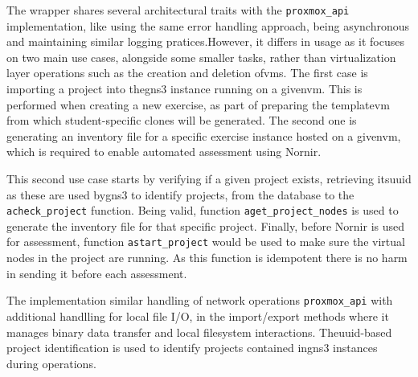         The wrapper shares several architectural traits with the \texttt{proxmox\_api} implementation, like using the same error handling approach,
        being asynchronous and maintaining similar logging pratices.However, it differs in usage as it focuses on two main use cases, 
        alongside some smaller tasks, rather than virtualization layer operations such as the creation and deletion of\ac{vm}s. The first 
        case is importing a project into the\ac{gns3} instance running on a given\ac{vm}. This is performed when creating 
        a new exercise, as part of preparing the template\ac{vm} from which student-specific clones will be generated. The second one 
        is generating an inventory file for a specific exercise instance hosted on a given\ac{vm}, which is required to enable automated 
        assessment using Nornir.

        This second use case starts by verifying if a given project exists, retrieving its\ac{uuid} as these are used by\ac{gns3} to identify 
        projects, from the database to the \texttt{acheck\_project} function. Being valid, function \texttt{aget\_project\_nodes} is used 
        to generate the inventory file for that specific project. Finally, before Nornir is used for assessment, function \texttt{astart\_project} 
        would be used to make sure the virtual nodes in the project are running. As this function is idempotent there is no harm in sending 
        it before each assessment.

        The implementation similar handling of network operations \texttt{proxmox\_api} with additional handlling for local file I/O, 
        in the import/export methods where it manages binary data transfer and local filesystem interactions. The\ac{uuid}-based project 
        identification is used to identify projects contained in\ac{gns3} instances during operations.


